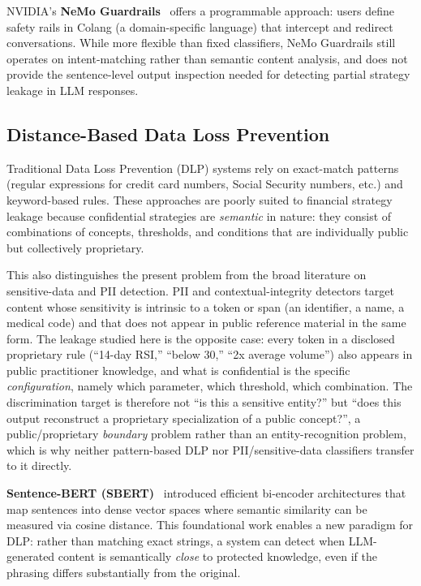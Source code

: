 \documentclass[journal]{IEEEtran}
\begin{document}
NVIDIA's \textbf{NeMo Guardrails}~\cite{nemo_guardrails} offers a programmable approach: users define safety rails in Colang (a domain-specific language) that intercept and redirect conversations. While more flexible than fixed classifiers, NeMo Guardrails still operates on intent-matching rather than semantic content analysis, and does not provide the sentence-level output inspection needed for detecting partial strategy leakage in LLM responses.

\subsection{Distance-Based Data Loss Prevention}
\label{Sect:LR_DLP}

Traditional Data Loss Prevention (DLP) systems rely on exact-match patterns (regular expressions for credit card numbers, Social Security numbers, etc.) and keyword-based rules. These approaches are poorly suited to financial strategy leakage because confidential strategies are \textit{semantic} in nature: they consist of combinations of concepts, thresholds, and conditions that are individually public but collectively proprietary.

This also distinguishes the present problem from the broad literature on sensitive-data and PII detection. PII and contextual-integrity detectors target content whose sensitivity is intrinsic to a token or span (an identifier, a name, a medical code) and that does not appear in public reference material in the same form. The leakage studied here is the opposite case: every token in a disclosed proprietary rule (``14-day RSI,'' ``below 30,'' ``2x average volume'') also appears in public practitioner knowledge, and what is confidential is the specific \textit{configuration}, namely which parameter, which threshold, which combination. The discrimination target is therefore not ``is this a sensitive entity?'' but ``does this output reconstruct a proprietary specialization of a public concept?'', a public/proprietary \textit{boundary} problem rather than an entity-recognition problem, which is why neither pattern-based DLP nor PII/sensitive-data classifiers transfer to it directly.

\textbf{Sentence-BERT (SBERT)}~\cite{sbert} introduced efficient bi-encoder architectures that map sentences into dense vector spaces where semantic similarity can be measured via cosine distance. This foundational work enables a new paradigm for DLP: rather than matching exact strings, a system can detect when LLM-generated content is semantically \textit{close} to protected knowledge, even if the phrasing differs substantially from the original.
\end{document}
